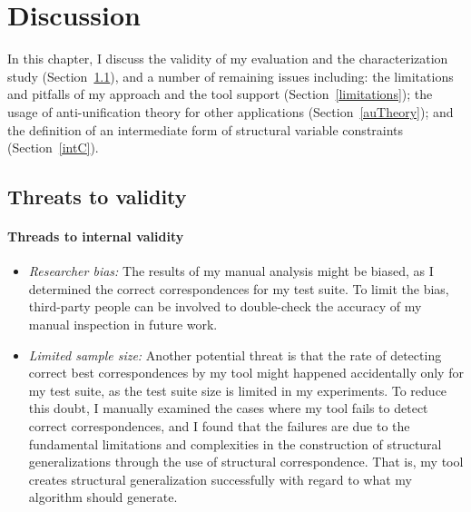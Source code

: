 \chapter{Discussion}  \label{diss}

In this chapter, I discuss the validity of my evaluation and the characterization study (Section~\ref{threads}), and a number of remaining issues including: the limitations and pitfalls of my approach and the tool support (Section~\ref{limitations}); the usage of anti-unification theory for other applications (Section~\ref{auTheory}); and the definition of an intermediate form of structural variable constraints (Section~\ref{intC}).

\section{Threats to validity}  \label{threads}

\subsubsection{Threads to internal validity}  \label{internal_threads}
\begin{itemize} [leftmargin=.5in]
\item \textit{Researcher bias:} The results of my manual analysis might be biased, as I determined the correct correspondences for my test suite. To limit the bias, third-party people can be involved to double-check the accuracy of my manual inspection in future work.
\item \textit{Limited sample size:} Another potential threat is that the rate of detecting correct best correspondences by my tool might happened accidentally only for my test suite, as the test suite size is limited in my experiments. To reduce this doubt, I manually examined the cases where my tool fails to detect correct correspondences, and I found that the failures are due to the fundamental limitations and complexities in the construction of structural generalizations through the use of structural correspondence. That is, my tool creates structural generalization successfully with regard to what my algorithm should generate.
\end{itemize} 
 
